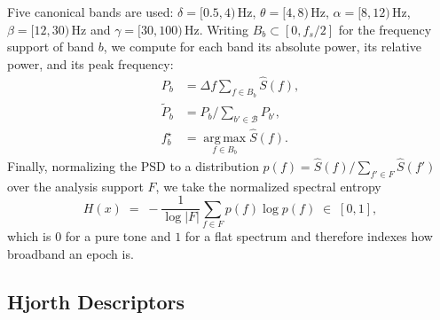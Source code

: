 Five canonical bands are used:
$\delta = [0.5, 4)$\,Hz,
$\theta = [4, 8)$\,Hz,
$\alpha = [8, 12)$\,Hz,
$\beta = [12, 30)$\,Hz and
$\gamma = [30, 100)$\,Hz.
Writing $B_b \subset [0, f_s/2]$ for the frequency support of band $b$,
we compute for each band its absolute power, its relative power, and its
peak frequency:
%
\begin{align}
P_b       &= \Delta f \!\!\sum_{f \in B_b}\!\! \hat{S}(f),
\label{eq:bandpower}\\
\tilde{P}_b &= P_b \Big/ \sum_{b' \in \mathcal{B}} P_{b'},
\label{eq:relpower}\\
f_b^{\star} &= \operatorname*{arg\,max}_{f \in B_b} \hat{S}(f).
\label{eq:peakfreq}
\end{align}
%
Finally, normalizing the PSD to a distribution
$p(f) = \hat{S}(f) / \sum_{f' \in F} \hat{S}(f')$ over the analysis support
$F$, we take the normalized spectral entropy
%
\begin{equation}
\label{eq:spectralentropy}
H(x) \;=\; -\frac{1}{\log |F|} \sum_{f \in F} p(f) \log p(f)
\;\in\; [0,1],
\end{equation}
%
which is $0$ for a pure tone and $1$ for a flat spectrum and therefore
indexes how broadband an epoch is.


\subsection{Hjorth Descriptors}
\label{subsec:hjorth}

